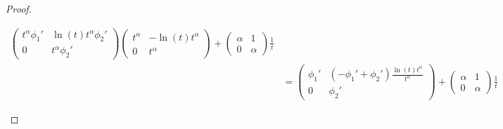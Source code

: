 \begin{proof}
\begin{enumerate}
\begin{align*}
\begin{pmatrix}
          t^\alpha \phi_1' & \ln(t)t^\alpha\phi_2'
          \\0 & t^\alpha \phi_2'
        \end{pmatrix} 
        \begin{pmatrix}
          t^\alpha & -\ln(t)t^\alpha
          \\ 0 & t^\alpha
        \end{pmatrix}
        +
        \begin{pmatrix} \alpha & 1 \\ 0 & \alpha \end{pmatrix} \frac{1}{t}
        \\&= \begin{pmatrix}
          \phi_1' & (-\phi_1'+\phi_2')\frac{\ln(t)t^\alpha}{t^\alpha}
          \\0 & \phi_2'
        \end{pmatrix} 
        +
        \begin{pmatrix} \alpha & 1 \\ 0 & \alpha \end{pmatrix} \frac{1}{t}
      \end{align*}
  \end{enumerate}
\end{proof}

